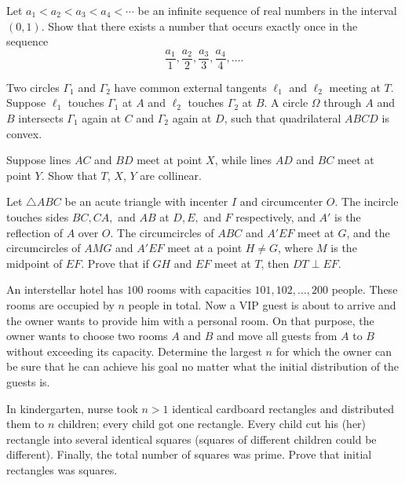 \documentclass[11pt]{scrartcl}
\begin{document}
\begin{problem}[8048961544243923335]
Let $a_1<a_2<a_3<a_4<\cdots$ be an infinite sequence of real numbers in the interval $(0,1)$. Show that there exists a number that occurs exactly once in the sequence
\[ \frac{a_1}{1},\frac{a_2}{2},\frac{a_3}{3},\frac{a_4}{4},\ldots.\]
\end{problem}
\begin{problem}[945532205287762]
Two circles $\Gamma_1$ and $\Gamma_2$ have common external tangents $\ell_1$ and $\ell_2$ meeting at $T$. Suppose $\ell_1$ touches $\Gamma_1$ at $A$ and $\ell_2$ touches $\Gamma_2$ at $B$. A circle $\Omega$ through $A$ and $B$ intersects $\Gamma_1$ again at $C$ and $\Gamma_2$ again at $D$, such that quadrilateral $ABCD$ is convex.

Suppose lines $AC$ and $BD$ meet at point $X$, while lines $AD$ and $BC$ meet at point $Y$. Show that $T$, $X$, $Y$ are collinear.
\end{problem}
\begin{problem}[456772085666528]
Let $\triangle ABC$ be an acute triangle with incenter $I$ and circumcenter $O$. The incircle touches sides $BC,CA,$ and $AB$ at $D,E,$ and $F$ respectively, and $A'$ is the reflection of $A$ over $O$. The circumcircles of $ABC$ and $A'EF$ meet at $G$, and the circumcircles of $AMG$ and $A'EF$ meet at a point $H\neq G$, where $M$ is the midpoint of $EF$. Prove that if $GH$ and $EF$ meet at $T$, then $DT\perp EF$.
\end{problem}
\begin{problem}[4429559846138102630]
An interstellar hotel has $100$ rooms with capacities $101,102,\ldots, 200$ people. These rooms are occupied by $n$ people in total. Now a VIP guest is about to arrive and the owner wants to provide him with a personal room. On that purpose, the owner wants to choose two rooms $A$ and $B$ and move all guests from $A$ to $B$ without exceeding its capacity. Determine the largest $n$ for which the owner can be sure that he can achieve his goal no matter what the initial distribution of the guests is.
\end{problem}
\begin{problem}[181463134716189]
	In kindergarten, nurse took $n>1$ identical cardboard rectangles and distributed them to $n$ children; every child got one rectangle. Every child cut his (her) rectangle into several identical squares (squares of different children could be different). Finally, the total number of squares was prime. Prove that initial rectangles was squares.
\end{problem}
\end{document}
